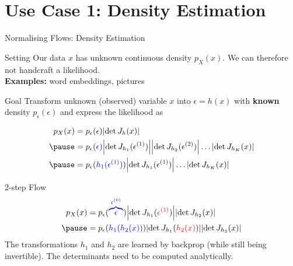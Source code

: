\section{Use Case 1: Density Estimation}
\begin{frame}
\tableofcontents[current]
\end{frame}

\begin{frame}{Normalising Flows: Density Estimation}
\begin{block}{Setting}
Our data $ x $ has unknown continuous density $ p_X(x) $.
We can therefore not handcraft a likelihood.
\\ \pause
\textbf{Examples:} word embeddings, pictures
\end{block}
\pause
\begin{block}{Goal}
Transform unknown (observed)	 variable $ x $ into $ \epsilon = h(x) $ with \textbf{known} density $ p_{\epsilon}(\epsilon) $ and express the likelihood as
\begin{small}
\pause
\begin{equation*}
\begin{aligned}
p_{X}(x) &= p_{\epsilon}(\epsilon)\djac{h}{x} \\ \pause
&= p_{\epsilon}(\textcolor{blue}{\epsilon})\djac{h_{1}}{\epsilon^{(1)}}\djac{h_{2}}{\epsilon^{(2)}}\ldots \djac{h_{K}}{x} \\ \pause
&= p_{\epsilon}(\textcolor{blue}{h_{1}(\epsilon^{(1)})})\djac{h_{1}}{\epsilon^{(1)}}\ldots \djac{h_{K}}{x}
\end{aligned}
\end{equation*}
\end{small}
\end{block}
\end{frame}

\begin{frame}{2-step Flow}
\begin{equation*}
\begin{aligned}
p_{X}(x) &= p_{\epsilon}(\textcolor{blue}{\overbrace{\epsilon}^{\epsilon^{(0)}}})\djac{h_{1}}{\textcolor{red}{\epsilon^{(1)}}}\djac{h_{2}}{x} \\ \pause
&= p_{\epsilon}(\textcolor{blue}{h_{1}(h_{2}(x))})\djac{h_{1}}{\textcolor{red}{h_{2}(x)}}\djac{h_{2}}{x}
\end{aligned}
\end{equation*}
\pause
The transformations $ h_{1} $ and $ h_{2} $ are learned by backprop (while still being invertible). The determinants need to be computed analytically.
\end{frame}

